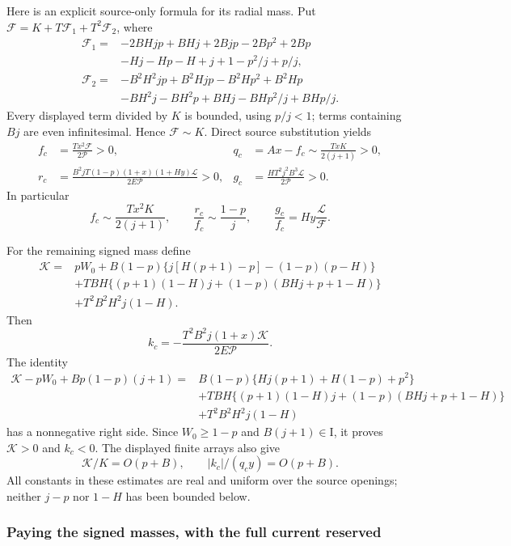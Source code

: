 Here is an explicit source-only formula for its radial mass. Put
$\mathcal F=K+T\mathcal F_1+T^2\mathcal F_2$, where
\begin{align*}
\mathcal F_1={}&-2BHjp+BHj+2Bjp-2Bp^2+2Bp\\
 &-Hj-Hp-H+j+1-p^2/j+p/j,\\
\mathcal F_2={}&-B^2H^2jp+B^2Hjp-B^2Hp^2+B^2Hp\\
 &-BH^2j-BH^2p+BHj-BHp^2/j+BHp/j.
 \tag{RSR15}
\end{align*}
Every displayed term divided by $K$ is bounded, using $p/j<1$;
terms containing $Bj$ are even infinitesimal. Hence $\mathcal F\sim K$.
Direct source substitution yields
\[
\begin{aligned}
 f_c&=\frac{Tx^2\mathcal F}{2\mathcal P}>0,&
 q_c&=Ax-f_c\sim\frac{TxK}{2(j+1)}>0,\\
 r_c&=\frac{B^2jT(1-p)(1+x)(1+Hy)\mathcal L}
                {2E\mathcal P}>0,&
 g_c&=\frac{HT^2j^2B^3\mathcal L}{2\mathcal P}>0.
\end{aligned}
 \tag{RSR16}
\]
In particular
\[
 f_c\sim\frac{Tx^2K}{2(j+1)},\qquad
 \frac{r_c}{f_c}\sim\frac{1-p}{j},\qquad
 \frac{g_c}{f_c}=Hy\frac{\mathcal L}{\mathcal F}.
 \tag{RSR17}
\]

For the remaining signed mass define
\begin{align*}
\mathcal K={}&pW_0+
 B(1-p)\{j[H(p+1)-p]-(1-p)(p-H)\}\\
 &+TBH\{(p+1)(1-H)j+(1-p)(BHj+p+1-H)\}\\
 &+T^2B^2H^2j(1-H).
 \tag{RSR18}
\end{align*}
Then
\[
 k_c=-\frac{T^2B^2j(1+x)\mathcal K}{2E\mathcal P}.
\]
The identity
\begin{align*}
\mathcal K-pW_0+Bp(1-p)(j+1)
={}&B(1-p)\{Hj(p+1)+H(1-p)+p^2\}\\
 &+TBH\{(p+1)(1-H)j+(1-p)(BHj+p+1-H)\}\\
 &+T^2B^2H^2j(1-H)
 \tag{RSR19}
\end{align*}
has a nonnegative right side. Since $W_0\geq1-p$ and
$B(j+1)\in\mathrm I$, it proves $\mathcal K>0$ and $k_c<0$.
The displayed finite arrays also give
\[
 \mathcal K/K=O(p+B),\qquad
 |k_c|/(q_cy)=O(p+B).
 \tag{RSR20}
\]
All constants in these estimates are real and uniform over the source
openings; neither $j-p$ nor $1-H$ has been bounded below.

\subsubsection*{Paying the signed masses, with the full current reserved}

